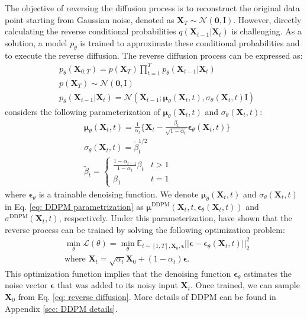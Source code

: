\documentclass[11pt]{article}
\begin{document}
The objective of reversing the diffusion process is to reconstruct the original data point starting from Gaussian noise, denoted as $\bm{X}_T \sim \mathcal{N}(\bm{0}, \bm{\mathrm{I}})$. However, directly calculating the reverse conditional probabilities $q(\bm{X}_{t-1}|\bm{X}_t)$ is challenging. As a solution, a model $p_{\theta}$ is trained to approximate these conditional probabilities and to execute the reverse diffusion. The reverse diffusion process can be expressed as:
\begin{align}\label{eq: reverse diffusion}
	&p_{\theta}(\bm{X}_{0:T})=p(\bm{X}_T)\prod_{t=1}^Tp_{\theta}(\bm{X}_{t-1}|\bm{X}_t)\\
	&p(\bm{X}_T)\sim \mathcal{N}(\bm{0}, \bm{\mathrm{I}})\\
	&p_{\theta}(\bm{X}_{t-1}|\bm{X}_t)=\mathcal{N}(\bm{X}_{t-1};\bm{\mu}_{\theta}(\bm{X}_t, t), \sigma_{\theta}(\bm{X}_t, t)\bm{\mathrm{I}})
\end{align}
\citep{ho2020denoising} considers the following parameterization of $\bm{\mu}_{\theta}(\bm{X}_t, t)$ and $\sigma_{\theta}(\bm{X}_t, t)$:
\begin{align}\label{eq: DDPM parametrization}
	&\bm{\mu}_{\theta}(\bm{X}_t, t)=\frac{1}{\alpha_t}\{\bm{X}_t-\frac{\beta_t}{\sqrt{1-\alpha_t}}\bm{\epsilon}_{\theta}(\bm{X}_t, t)\}\\
	&\sigma_{\theta}(\bm{X}_t, t)=\tilde{\beta}_t^{1/2}\\
	&\tilde{\beta}_t= \begin{cases}\frac{1-\alpha_{t-1}}{1-\alpha_t} \beta_t & t>1 \\ \beta_1 & t=1\end{cases}
\end{align}
where $\bm{\epsilon}_{\theta}$ is a trainable denoising function. We denote $\bm{\mu}_{\theta}(\bm{X}_t,t)$ and $\sigma_{\theta}(\bm{X}_t, t)$ in Eq. \ref{eq: DDPM parametrization} as $\bm{\mu}^{\mathrm{DDPM}}(\bm{X}_t, t, \bm{\epsilon}_{\theta}(\bm{X}_t, t))$ and $\sigma^{\mathrm{DDPM}}(\bm{X}_t, t)$, respectively. Under this parameterization, \citet{ho2020denoising} have shown that the reverse process can be trained by solving the following optimization problem:
\begin{align}
	&\min_{\theta}\mathcal{L}(\theta)=\min_{\theta}\mathbb{E}_{t\sim [1,T],\bm{X}_0,\bm{\epsilon}}||\bm{\epsilon}-\bm{\epsilon}_{\theta}(\bm{X}_t, t)||^2_2\\
	&\mbox{where } \bm{X}_t=\sqrt{\alpha_t}\bm{X}_0+(1-\alpha_t)\bm{\epsilon}.
\end{align}
This optimization function implies that the denoising function $\bm{\epsilon}_{\theta}$ estimates the noise vector $\bm{\epsilon}$ that was added to its noisy input $\bm{X}_t$. Once trained, we can sample $\bm{X}_0$ from Eq. \ref{eq: reverse diffusion}. More details of DDPM can be found in Appendix \ref{sec: DDPM details}.
\end{document}
